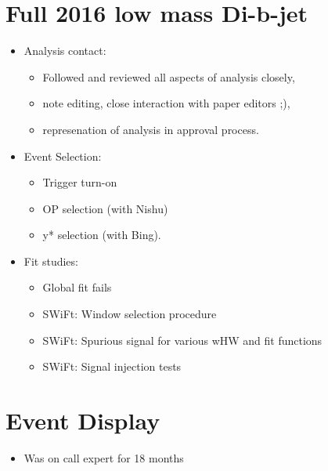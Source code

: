 \section{Full 2016 low mass Di-b-jet}

\begin{itemize}
\item{Analysis contact:}
  \begin{itemize}[label={$-$}]
  \item{Followed and reviewed all aspects of analysis closely,}
  \item{note editing, close interaction with paper editors ;),}
  \item{represenation of analysis in approval process.}
  \end{itemize}
\item{Event Selection:}
  \begin{itemize}[label={$-$}]
  \item{Trigger turn-on}
  \item{OP selection (with Nishu)}
  \item{y* selection (with Bing). }
  \end{itemize}
\item{Fit studies:}
  \begin{itemize}[label={$-$}]
  \item{Global fit fails}
  \item{SWiFt: Window selection procedure}
  \item{SWiFt: Spurious signal for various wHW and fit functions}
  \item{SWiFt: Signal injection tests}
  \end{itemize}
\end{itemize}

\section{Event Display}
\begin{itemize}
  \item{Was on call expert for 18 months}
\end{itemize}
